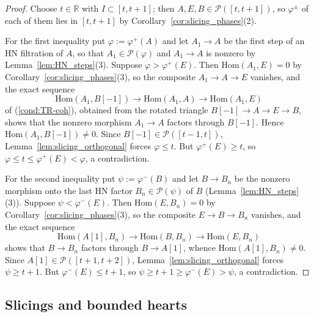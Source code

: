 \documentclass[12pt]{amsart}
\newcommand{\condref}[1]{\textup{(\ref{#1})}}
\numberwithin{theorem}{section}
\theoremstyle{definition}
\newcommand{\RR}{\mathbb{R}}
\newcommand{\calP}{\mathcal{P}}
\newcommand{\Hom}{\mathrm{Hom}}
\begin{document}
	\begin{proof}
		Choose $t \in \RR$ with $I \subset [t, t + 1]$;
		then $A, E, B \in \calP([t, t + 1])$, so $\varphi^{\pm}$ of each of them lies in $[t, t + 1]$ by Corollary~\ref{cor:slicing_phases}(2).

		For the first inequality put $\varphi := \varphi^+(A)$ and let $A_1 \to A$ be the first step of an HN filtration of $A$, so that $A_1 \in \calP(\varphi)$ and $A_1 \to A$ is nonzero by Lemma~\ref{lem:HN_steps}(3).
		Suppose $\varphi > \varphi^+(E)$.
		Then $\Hom(A_1, E) = 0$ by Corollary~\ref{cor:slicing_phases}(3), so the composite $A_1 \to A \to E$ vanishes, and the exact sequence
		\[
		\Hom(A_1, B[-1]) \to \Hom(A_1, A) \to \Hom(A_1, E)
		\]
		of \condref{cond:TR-coh}, obtained from the rotated triangle $B[-1] \to A \to E \to B$, shows that the nonzero morphism $A_1 \to A$ factors through $B[-1]$.
		Hence $\Hom(A_1, B[-1]) \neq 0$.
		Since $B[-1] \in \calP([t - 1, t])$, Lemma~\ref{lem:slicing_orthogonal} forces $\varphi \leqslant t$.
		But $\varphi^+(E) \geqslant t$, so $\varphi \leqslant t \leqslant \varphi^+(E) < \varphi$, a contradiction.

		For the second inequality put $\psi := \varphi^-(B)$ and let $B \to B_n$ be the nonzero morphism onto the last HN factor $B_n \in \calP(\psi)$ of $B$ (Lemma~\ref{lem:HN_steps}(3)).
		Suppose $\psi < \varphi^-(E)$.
		Then $\Hom(E, B_n) = 0$ by Corollary~\ref{cor:slicing_phases}(3), so the composite $E \to B \to B_n$ vanishes, and the exact sequence
		\[
		\Hom(A[1], B_n) \to \Hom(B, B_n) \to \Hom(E, B_n)
		\]
		shows that $B \to B_n$ factors through $B \to A[1]$, whence $\Hom(A[1], B_n) \neq 0$.
		Since $A[1] \in \calP([t + 1, t + 2])$, Lemma~\ref{lem:slicing_orthogonal} forces $\psi \geqslant t + 1$.
		But $\varphi^-(E) \leqslant t + 1$, so $\psi \geqslant t + 1 \geqslant \varphi^-(E) > \psi$, a contradiction.
	\end{proof}

	\subsection{Slicings and bounded hearts}
\end{document}
